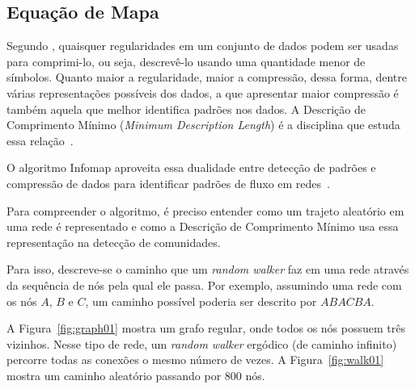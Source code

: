 \documentclass[12pt,a4paper]{article}
\begin{document}
\subsection{Equação de Mapa} \label{sec:infomap}

Segundo , quaisquer regularidades em um conjunto de dados podem ser usadas para comprimi-lo, ou seja, descrevê-lo usando uma quantidade menor de símbolos. Quanto maior a regularidade, maior a compressão, dessa forma, dentre várias representações possíveis dos dados, a que apresentar maior compressão é também aquela que melhor identifica padrões nos dados. A Descrição de Comprimento Mínimo (\textit{Minimum Description Length}) é a disciplina que estuda essa relação~\cite{Grunwald2007-bt}.

O algoritmo Infomap aproveita essa dualidade entre detecção de padrões e compressão de dados para identificar padrões de fluxo em redes~\cite{Rosvall2009-sd}.

Para compreender o algoritmo, é preciso entender como um trajeto aleatório em uma rede é representado e como a Descrição de Comprimento Mínimo usa essa representação na detecção de comunidades.

Para isso, descreve-se o caminho que um \textit{random walker} faz em uma rede através da sequência de nós pela qual ele passa. Por exemplo, assumindo uma rede com os nós $A$, $B$ e $C$, um caminho possível poderia ser descrito por $ABACBA$.

A Figura~\ref{fig:graph01} mostra um grafo regular, onde todos os nós possuem três vizinhos. Nesse tipo de rede, um \textit{random walker} ergódico (de caminho infinito) percorre todas as conexões o mesmo número de vezes. A Figura~\ref{fig:walk01} mostra um caminho aleatório passando por 800 nós.
\end{document}
